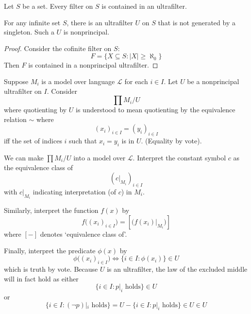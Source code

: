 \documentclass{scrartcl}
\begin{document}
\renewcommand{\proofSymbol}{\textrm{\fontspec{NotoEmoji-Regular}👍}}
\begin{lemma}\label{lem:ultra}
  Let $S$ be a set. Every filter on $S$ is contained in an ultrafilter. 
\end{lemma}
\begin{cor}
  For any infinite set $S$, there is an ultrafilter $U$ on $S$ that is not generated by a singleton. Such a $U$ is nonprincipal. 
\end{cor}
\begin{proof}
  Consider the cofinite filter on $S$:
  \[
  F=\{X\subseteq S: |X|\geq \aleph_0\}
  \]
  Then $F$ is contained in a nonprincipal ultrafilter. 
\end{proof}
\begin{defn}[ultrapower]
  Suppose $M_i$ is a model over language $\mathcal L$ for each $i\in I$. Let $U$ be a nonprincipal ultrafilter on $I$. Consider
  \[
  \prod M_i / U
  \]
  where quotienting by $U$ is understood to mean quotienting by the equivalence relation $\sim$ where
  \[
  (x_i)_{i\in I} = (y_i)_{i\in I}
  \]
  iff the set of indices $i$ such that $x_i = y_i$ is in $U$. (Equality by vote).
  
  We can make $\prod M_i / U$ into a model over $\mathcal L$. Interpret the constant symbol $c$ as the equivalence class of
  \[
  (c|_{M_i})_{i\in I}
  \]
  with $c|_{M_i}$ indicating interpretation (of $c$) in $M_i$. 
  
  Similarly, interpret the function $f(x)$ by
  \[
  f\bigl( (x_i)_{i\in I} \bigr) = \left[\bigl( f(x_i)|_{M_i}\bigr)\right]
  \]
  where $[-]$ denotes `equivalence class of'. 
  
  Finally, interpret the predicate $\phi(x)$ by 
  \[
  \phi\bigl((x_i)_{i\in I}\bigr) \iff \{i\in I: \phi(x_i)\} \in U
  \]
  which is truth by vote. Because $U$ is an ultrafilter, the law of the excluded middle will in fact hold as either 
  \[
  \{i\in I: p|_i\textrm{ holds}\} \in U
  \]
  or 
  \[
  \{i\in I: (\neg p)|_i\textrm{ holds}\} = U-   \{i\in I: p|_i\textrm{ holds}\} \in U\in U
  \]
\end{defn}
\end{document}
